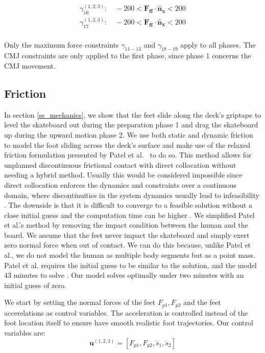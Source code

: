 \documentclass[default,iicol]{sn-jnl}
\begin{document}
\begin{equation}
    \begin{array}{c}
         \gamma_{16}^{(1,2,3)}:\quad  -200 < \mathbf{F_{ff}}\cdot \mathbf{\hat n_x} < 200  \\
         \gamma_{17}^{(1,2,3)}: \quad -200 < \mathbf{F_{ff}}\cdot \mathbf{\hat n_x} < 200 \\ 
    \end{array}
\end{equation}

Only the maximum force constraints $\gamma_{11-13}$ and $\gamma_{18-19}$ apply to all phases. The CMJ constraints are only applied to the first phase, since phase 1 concerns the CMJ movement. 

\subsection{Friction}
In section \ref{ss_mechanics}, we show that the feet slide along the deck's
griptape to level the skateboard out during the preparation phase 1 and drag
the skateboard up during the upward motion phase 2.
We use both static and dynamic friction to model the foot sliding across the
deck's surface and make use of the relaxed friction formulation presented by
Patel et al.~\cite{patel_contact-implicit_2019} to do so.
This method allows for unplanned discontinuous frictional contact with direct
collocation without needing a hybrid method.
Usually this would be considered impossible since direct collocation enforces
the dynamics and constraints over a continuous domain, where discontinuities in
the system dynamics usually lead to infeasibility
\cite{kelly_transcription_2017}.
The downside is that it is difficult to converge to a feasible solution without
a close initial guess and the computation time can be higher
\cite{shield_contact-implicit_2022,patel_contact-implicit_2019}.
We simplified Patel et al.'s method by removing the impact condition between
the human and the board.
We assume that the feet never impact the skateboard and simply exert zero
normal force when out of contact.
We can do this because, unlike Patel et al., we do not model the human as
multiple body segments but as a point mass.
Patel et al. requires the initial guess to be similar to the solution, and the
model 43 minutes to solve \cite{shield_contact-implicit_2022}. Our model solves
optimally under two minutes with an initial guess of zero.

We start by setting the normal forces of the feet $F_{p1},F_{p2}$ and the feet
accerelations as control variables.
The acceleration is controlled instead of the foot location itself to ensure
have smooth realistic foot trajectories.
Our control variables are:
%
\begin{equation}
    \mathbf{u}^{(1,2,3)} = [F_{p1},F_{p2},\ddot s_1, \ddot s_2]
\end{equation}
\end{document}
